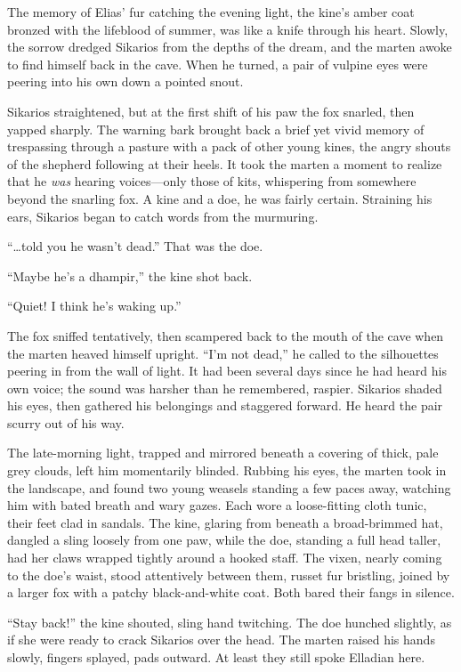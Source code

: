 The memory of Elias' fur catching the evening light, the kine's amber coat bronzed with the lifeblood of summer, was like a knife through his heart. Slowly, the sorrow dredged Sikarios from the depths of the dream, and the marten awoke to find himself back in the cave. When he turned, a pair of vulpine eyes were peering into his own down a pointed snout.

Sikarios straightened, but at the first shift of his paw the fox snarled, then yapped sharply. The warning bark brought back a brief yet vivid memory of trespassing through a pasture with a pack of other young kines, the angry shouts of the shepherd following at their heels. It took the marten a moment to realize that he \emph{was} hearing voices---only those of kits, whispering from somewhere beyond the snarling fox. A kine and a doe, he was fairly certain. Straining his ears, Sikarios began to catch words from the murmuring.

``\ldots{}told you he wasn't dead.'' That was the doe.

``Maybe he's a dhampir,'' the kine shot back.

``Quiet! I think he's waking up.''

The fox sniffed tentatively, then scampered back to the mouth of the cave when the marten heaved himself upright. ``I'm not dead,'' he called to the silhouettes peering in from the wall of light. It had been several days since he had heard his own voice; the sound was harsher than he remembered, raspier. Sikarios shaded his eyes, then gathered his belongings and staggered forward. He heard the pair scurry out of his way.

The late-morning light, trapped and mirrored beneath a covering of thick, pale grey clouds, left him momentarily blinded. Rubbing his eyes, the marten took in the landscape, and found two young weasels standing a few paces away, watching him with bated breath and wary gazes. Each wore a loose-fitting cloth tunic, their feet clad in sandals. The kine, glaring from beneath a broad-brimmed hat, dangled a sling loosely from one paw, while the doe, standing a full head taller, had her claws wrapped tightly around a hooked staff. The vixen, nearly coming to the doe's waist, stood attentively between them, russet fur bristling, joined by a larger fox with a patchy black-and-white coat. Both bared their fangs in silence.

``Stay back!'' the kine shouted, sling hand twitching. The doe hunched slightly, as if she were ready to crack Sikarios over the head. The marten raised his hands slowly, fingers splayed, pads outward. At least they still spoke Elladian here.

